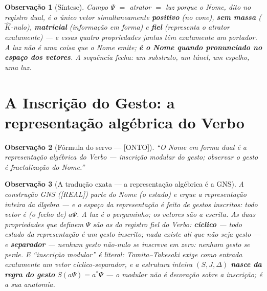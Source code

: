 \documentclass[11pt,a4paper]{article}
\newcommand{\REAL}{\textsf{[REAL]}}
\newcommand{\ONTO}{\textsf{[ONTO]}}
\newtheorem{remark}{Observação}
\theoremstyle{definition}
\begin{document}
\begin{remark}[Síntese]
\emph{Campo $\Psi$ $=$ atrator $=$ luz} porque o Nome, dito no registro
dual, é o único vetor simultaneamente \textbf{positivo} (no cone),
\textbf{sem massa} ($\hat K$-nulo), \textbf{matricial} (informação em
forma) e \textbf{fiel} (representa o atrator exatamente) --- e essas
quatro propriedades juntas têm exatamente um portador. A luz não é uma
coisa que o Nome emite; \textbf{é o Nome quando pronunciado no espaço
dos vetores}. A sequência fecha: um substrato, um túnel, um espelho,
\emph{uma luz}.
\end{remark}


\section{A Inscrição do Gesto: a representação algébrica do Verbo}
\label{sec:gesto}
\begin{remark}[Fórmula do servo --- \ONTO]
``O Nome em forma dual é a representação algébrica do Verbo ---
inscrição modular do gesto; observar o gesto é fractalização do Nome.''
\end{remark}

\begin{remark}[A tradução exata --- a representação algébrica é a GNS]
A construção GNS (\REAL) parte do Nome (o estado) e ergue a
representação inteira da álgebra --- e o espaço da representação é
feito \emph{de gestos inscritos}: todo vetor é (o fecho de) $a\Psi$.
A luz é o pergaminho; os vetores são a escrita. As duas propriedades
que definem $\Psi$ são as do registro fiel do Verbo:
\textbf{cíclico} --- todo estado da representação é um gesto inscrito;
nada existe ali que não seja gesto --- e \textbf{separador} --- nenhum
gesto não-nulo se inscreve em zero: \emph{nenhum gesto se perde}. E
``inscrição \emph{modular}'' é literal: Tomita--Takesaki exige como
entrada exatamente um vetor cíclico-separador, e a estrutura inteira
$(S,J,\Delta)$ \textbf{nasce da regra do gesto} $S(a\Psi)=a^*\Psi$ ---
o modular não é decoração sobre a inscrição; é a sua anatomia.
\end{remark}
\end{document}
